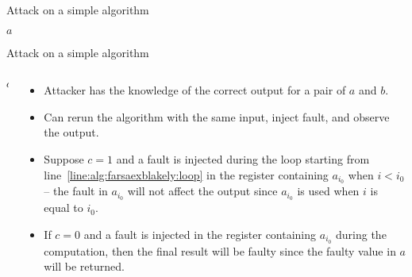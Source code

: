 \begin{frame}{Attack on a simple algorithm}
    \begin{algorithm}[H]
  	\Return $a$
\caption{An algorithm involving computing modular multiplication with Blakely's method.}
\end{algorithm}
\end{frame}

\begin{frame}{Attack on a simple algorithm}
\begin{columns}[T] %
\begin{column}{.4\textwidth}
{
\setlength{\interspacetitleruled}{0pt}%
\setlength{\algotitleheightrule}{0pt}%
\begin{algorithm}[H]
  	\Return $a$
\end{algorithm}
}
\end{column}%
\hfill%
\begin{column}{.6\textwidth}
 \begin{itemize}
        \item Attacker has the knowledge of the correct output for a pair of $a$ and $b$.
       \item Can rerun the algorithm with the same input, inject fault, and observe the output.
        \item Suppose $c=1$ and a fault is injected during the loop starting from line~\ref{line:alg:farsaexblakely:loop} in the register containing $a_{i_0}$ when $i<i_0$ -- the fault in $a_{i_0}$ will not affect the output since $a_{i_0}$ is used when $i$ is equal to $i_0$.
       \item If $c=0$ and a fault is injected in the register containing $a_{i_0}$ during the computation, then the final result will be faulty since the faulty value in $a$ will be returned.
    \end{itemize}
\end{column}%
\end{columns}
\end{frame}


